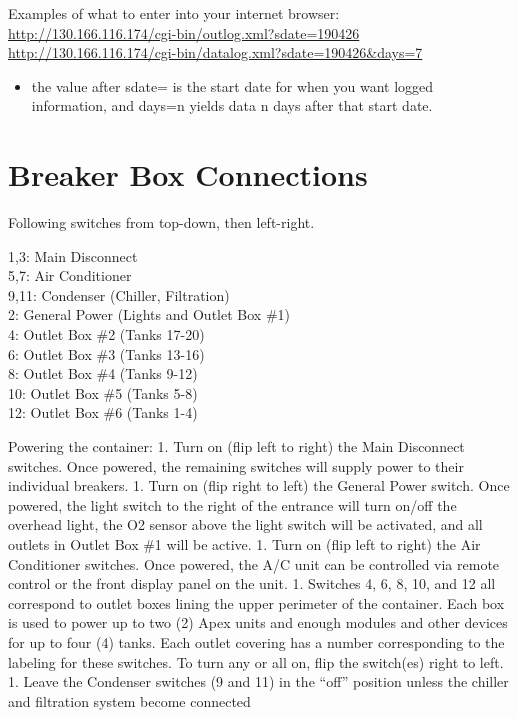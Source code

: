 \documentclass[]{book}
\providecommand{\tightlist}{%
  \setlength{\itemsep}{0pt}\setlength{\parskip}{0pt}}
\begin{document}
Examples of what to enter into your internet browser:\\
\url{http://130.166.116.174/cgi-bin/outlog.xml?sdate=190426}\\
\url{http://130.166.116.174/cgi-bin/datalog.xml?sdate=190426\&days=7}

\begin{itemize}
\tightlist
\item
  the value after sdate= is the start date for when you want logged
  information, and days=n yields data n days after that start date.
\end{itemize}

\chapter{Breaker Box Connections}\label{breaker-box-connections}

Following switches from top-down, then left-right.

1,3: Main Disconnect\\
5,7: Air Conditioner\\
9,11: Condenser (Chiller, Filtration)\\
2: General Power (Lights and Outlet Box \#1)\\
4: Outlet Box \#2 (Tanks 17-20)\\
6: Outlet Box \#3 (Tanks 13-16)\\
8: Outlet Box \#4 (Tanks 9-12)\\
10: Outlet Box \#5 (Tanks 5-8)\\
12: Outlet Box \#6 (Tanks 1-4)

Powering the container: 1. Turn on (flip left to right) the Main
Disconnect switches. Once powered, the remaining switches will supply
power to their individual breakers. 1. Turn on (flip right to left) the
General Power switch. Once powered, the light switch to the right of the
entrance will turn on/off the overhead light, the O2 sensor above the
light switch will be activated, and all outlets in Outlet Box \#1 will
be active. 1. Turn on (flip left to right) the Air Conditioner switches.
Once powered, the A/C unit can be controlled via remote control or the
front display panel on the unit. 1. Switches 4, 6, 8, 10, and 12 all
correspond to outlet boxes lining the upper perimeter of the container.
Each box is used to power up to two (2) Apex units and enough modules
and other devices for up to four (4) tanks. Each outlet covering has a
number corresponding to the labeling for these switches. To turn any or
all on, flip the switch(es) right to left. 1. Leave the Condenser
switches (9 and 11) in the ``off'' position unless the chiller and
filtration system become connected


\end{document}
